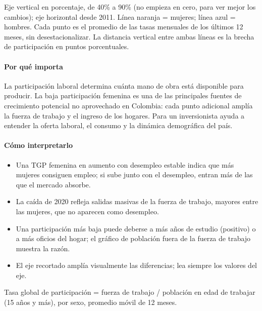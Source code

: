 \begin{leer}
Eje vertical en porcentaje, de 40\% a 90\% (no empieza en cero, para ver mejor los cambios); eje horizontal desde 2011. Línea naranja = mujeres; línea azul = hombres. Cada punto es el promedio de las tasas mensuales de los últimos 12 meses, sin desestacionalizar. La distancia vertical entre ambas líneas es la brecha de participación en puntos porcentuales.
\end{leer}

\paragraph{Por qué importa}
La participación laboral determina cuánta mano de obra está disponible para producir. La baja participación femenina es una de las principales fuentes de crecimiento potencial no aprovechado en Colombia: cada punto adicional amplía la fuerza de trabajo y el ingreso de los hogares. Para un inversionista ayuda a entender la oferta laboral, el consumo y la dinámica demográfica del país.

\paragraph{Cómo interpretarlo}
\begin{itemize}
\item Una TGP femenina en aumento con desempleo estable indica que más mujeres consiguen empleo; si sube junto con el desempleo, entran más de las que el mercado absorbe.
\item La caída de 2020 refleja salidas masivas de la fuerza de trabajo, mayores entre las mujeres, que no aparecen como desempleo.
\item Una participación más baja puede deberse a más años de estudio (positivo) o a más oficios del hogar; el gráfico de población fuera de la fuerza de trabajo muestra la razón.
\item El eje recortado amplía visualmente las diferencias; lea siempre los valores del eje.
\end{itemize}
\begin{formulas}[Fórmulas]
\end{formulas}
\begin{metodo}[Metodología]
Tasa global de participación = fuerza de trabajo / población en edad de trabajar (15 años y más), por sexo, promedio móvil de 12 meses.
\par{}
\end{metodo}


